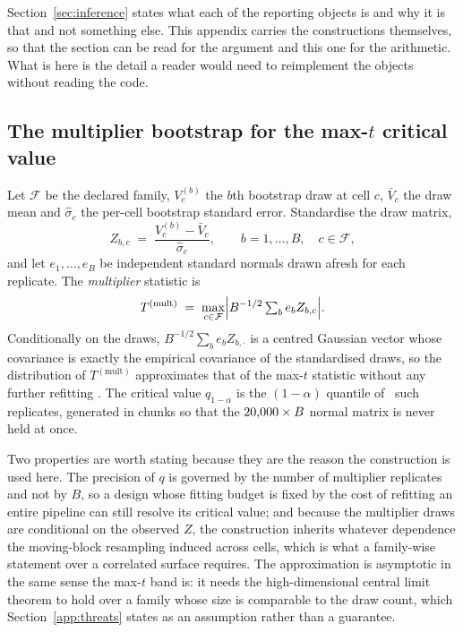 
Section~\ref{sec:inference} states what each of the reporting objects is and
why it is that and not something else. This appendix carries the constructions
themselves, so that the section can be read for the argument and this one for
the arithmetic. What is here is the detail a reader would need to reimplement
the objects without reading the code.

\subsection*{The multiplier bootstrap for the max-$t$ critical value}
\label{app:multiplier}

Let $\mathcal{F}$ be the declared family, $V^{(b)}_c$ the $b$th bootstrap draw
at cell $c$, $\bar V_c$ the draw mean and $\hat\sigma_c$ the per-cell
bootstrap standard error. Standardise the draw matrix,
\[
Z_{b,c} \;=\; \frac{V^{(b)}_c - \bar V_c}{\hat\sigma_c},
\qquad b = 1,\dots,B, \quad c \in \mathcal{F},
\]
and let $e_1,\dots,e_B$ be independent standard normals drawn afresh for each
replicate. The \emph{multiplier} statistic is
\[
T^{(\mathrm{mult})} \;=\; \max_{c \in \mathcal{F}}
\Bigl| B^{-1/2}\textstyle\sum_{b} e_b Z_{b,c} \Bigr| .
\]
Conditionally on the draws, $B^{-1/2}\sum_b e_b Z_{b,\cdot}$ is a centred
Gaussian vector whose covariance is exactly the empirical covariance of the
standardised draws, so the distribution of $T^{(\mathrm{mult})}$ approximates
that of the max-$t$ statistic without any further refitting
\citep{chernozhukov2013gaussian}. The critical value $q_{1-\alpha}$ is the
$(1-\alpha)$ quantile of \nMultiplier\ such replicates, generated in chunks so
that the ${20{,}000}\times B$ normal matrix is never held at once.

Two properties are worth stating because they are the reason the construction
is used here. The precision of $q$ is governed by the number of multiplier
replicates and not by $B$, so a design whose fitting budget is fixed by the
cost of refitting an entire pipeline can still resolve its critical value; and
because the multiplier draws are conditional on the observed $Z$, the
construction inherits whatever dependence the moving-block resampling induced
across cells, which is what a family-wise statement over a correlated surface
requires. The approximation is asymptotic in the same sense the max-$t$ band
is: it needs the high-dimensional central limit theorem to hold over a family
whose size is comparable to the draw count, which Section~\ref{app:threats}
states as an assumption rather than a guarantee.

